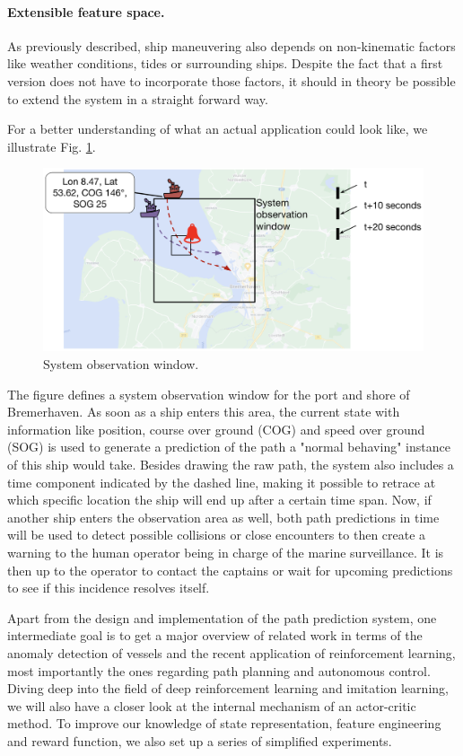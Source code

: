 \paragraph{Extensible feature space.}
As previously described, ship maneuvering also depends on non-kinematic factors like weather conditions, tides or surrounding ships. Despite the fact that a first version does not have to incorporate those factors, it should in theory be possible to extend the system in a straight forward way.


For a better understanding of what an actual application could look like, we illustrate Fig. \ref{fig:systemObservation}.
\begin{figure}[H]
    \centering
    \includegraphics[width=\textwidth]{images/system_observation.png}
    \caption{System observation window.}
    \label{fig:systemObservation}
\end{figure}

The figure defines a system observation window for the port and shore of Bremerhaven. As soon as a ship enters this area, the current state with information like position, course over ground (COG) and speed over ground (SOG) is used to generate a prediction of the path a "normal behaving" instance of this ship would take. Besides drawing the raw path, the system also includes a time component indicated by the dashed line, making it possible to retrace at which specific location the ship will end up after a certain time span. Now, if another ship enters the observation area as well, both path predictions in time will be used to detect possible collisions or close encounters to then create a warning to the human operator being in charge of the marine surveillance. It is then up to the operator to contact the captains or wait for upcoming predictions to see if this incidence resolves itself.
\par
Apart from the design and implementation of the path prediction system, one intermediate goal is to get a major overview of related work in terms of the anomaly detection of vessels and the recent application of reinforcement learning, most importantly the ones regarding path planning and autonomous control. Diving deep into the field of deep reinforcement learning and imitation learning, we will also have a closer look at the internal mechanism of an actor-critic method. To improve our knowledge of state representation, feature engineering and reward function, we also set up a series of simplified experiments.